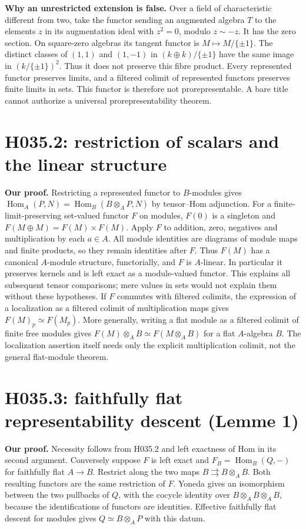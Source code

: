 \textbf{Why an unrestricted extension is false.} Over a field of
characteristic different from two, take the functor sending an augmented
algebra $T$ to the elements $z$ in its augmentation ideal with $z^2=0$,
modulo $z\sim-z$. It has the zero section. On square-zero algebras its
tangent functor is $M\mapsto M/\{\pm1\}$. The distinct classes of
$(1,1)$ and $(1,-1)$ in $(k\oplus k)/\{\pm1\}$ have the same image
in $(k/\{\pm1\})^2$. Thus it does not preserve this fibre product.
Every represented functor preserves limits, and a filtered colimit of
represented functors preserves finite limits in sets. This functor is
therefore not prorepresentable. A bare title cannot authorize a universal
prorepresentability theorem.

\section{H035.2: restriction of scalars and the linear structure}
\textbf{Our proof.} Restricting a represented functor to $B$-modules gives
$\operatorname{Hom}_A(P,N)=\operatorname{Hom}_B(B\otimes_A P,N)$ by
tensor--Hom adjunction. For a finite-limit-preserving set-valued functor
$F$ on modules, $F(0)$ is a singleton and
$F(M\oplus M)=F(M)\times F(M)$. Apply $F$ to addition, zero, negatives
and multiplication by each $a\in A$. All module identities are diagrams
of module maps and finite products, so they remain identities after $F$.
Thus $F(M)$ has a canonical $A$-module structure, functorially, and $F$
is $A$-linear. In particular it preserves kernels and is left exact as a
module-valued functor. This explains all subsequent tensor comparisons;
mere values in sets would not explain them without these hypotheses.
If $F$ commutes with filtered colimits, the expression of a localization
as a filtered colimit of multiplication maps gives
$F(M)_p\simeq F(M_p)$. More generally, writing a flat module as a
filtered colimit of finite free modules gives
$F(M)\otimes_A B\simeq F(M\otimes_A B)$ for a flat $A$-algebra $B$.
The localization assertion itself needs only the explicit multiplication
colimit, not the general flat-module theorem.

\section{H035.3: faithfully flat representability descent (Lemme 1)}
\textbf{Our proof.} Necessity follows from H035.2 and left exactness of Hom
in its second argument. Conversely suppose $F$ is left exact and
$F_B=\operatorname{Hom}_B(Q,-)$ for faithfully flat $A\to B$. Restrict
along the two maps $B\rightrightarrows B\otimes_A B$. Both resulting
functors are the same restriction of $F$. Yoneda gives an isomorphism
between the two pullbacks of $Q$, with the cocycle identity over
$B\otimes_A B\otimes_A B$, because the identifications of functors
are identities. Effective faithfully flat descent for modules gives
$Q\simeq B\otimes_A P$ with this datum.

